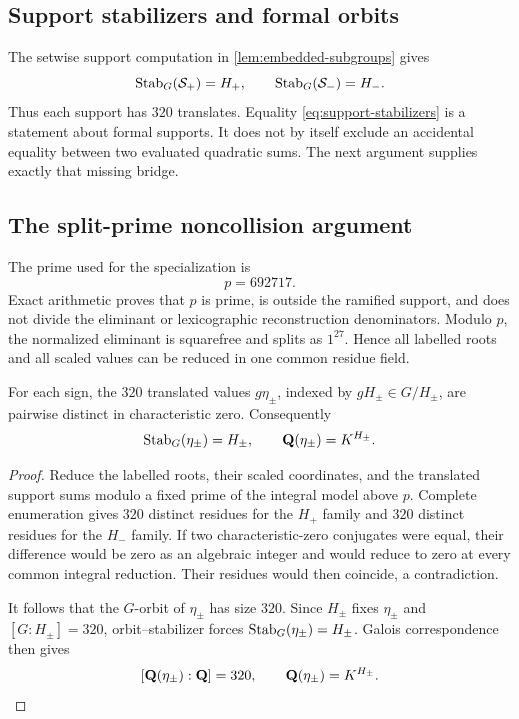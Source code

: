 \subsection{Support stabilizers and formal orbits}

The setwise support computation in \cref{lem:embedded-subgroups} gives
\begin{equation}
 \operatorname{Stab}_G(\mathcal{S}_+)=H_+,
 \qquad
 \operatorname{Stab}_G(\mathcal{S}_-)=H_-.
 \label{eq:support-stabilizers}
\end{equation}
Thus each support has $320$ translates.  Equality
\eqref{eq:support-stabilizers} is a statement about formal supports.  It
does not by itself exclude an accidental equality between two evaluated
quadratic sums.  The next argument supplies exactly that missing bridge.

\subsection{The split-prime noncollision argument}

The prime used for the specialization is
\begin{equation}
 p=692717.
 \label{eq:split-prime}
\end{equation}
Exact arithmetic proves that $p$ is prime, is outside the ramified support,
and does not divide the eliminant or lexicographic reconstruction
denominators.  Modulo $p$, the normalized eliminant is squarefree and splits
as $1^{27}$.  Hence all labelled roots and all scaled values can be reduced
in one common residue field.

\begin{lemma}
\label{lem:split-noncollision}
For each sign, the $320$ translated values $g\eta_\pm$, indexed by
$gH_\pm\in G/H_\pm$, are pairwise distinct in characteristic zero.
Consequently
\[
 \operatorname{Stab}_G(\eta_\pm)=H_\pm,
 \qquad
 \mathbf{Q}(\eta_\pm)=K^{H_\pm}.
\]
\end{lemma}

\begin{proof}
Reduce the labelled roots, their scaled coordinates, and the translated
support sums modulo a fixed prime of the integral model above $p$.  Complete
enumeration gives $320$ distinct residues for the $H_+$ family and $320$
distinct residues for the $H_-$ family.  If two characteristic-zero
conjugates were equal, their difference would be zero as an algebraic
integer and would reduce to zero at every common integral reduction.  Their
residues would then coincide, a contradiction.

It follows that the $G$-orbit of $\eta_\pm$ has size $320$.  Since
$H_\pm$ fixes $\eta_\pm$ and $[G:H_\pm]=320$, orbit--stabilizer forces
$\operatorname{Stab}_G(\eta_\pm)=H_\pm$.  Galois correspondence then gives
\[
 [\mathbf{Q}(\eta_\pm):\mathbf{Q}]=320,
 \qquad
 \mathbf{Q}(\eta_\pm)=K^{H_\pm}.
\]
\end{proof}


